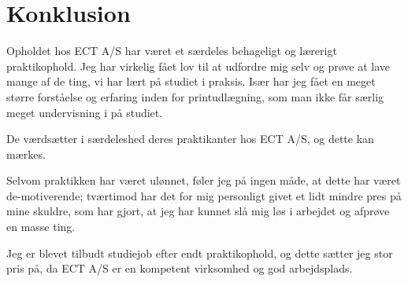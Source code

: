 \chapter{Konklusion}

Opholdet hos ECT A/S har været et særdeles behageligt og lærerigt praktikophold. Jeg har virkelig fået lov til at udfordre mig selv og prøve at lave mange af de ting, vi har lært på studiet i praksis. Især har jeg fået en meget større forståelse og erfaring inden for printudlægning, som man ikke får særlig meget undervisning i på studiet. 

De værdsætter i særdeleshed deres praktikanter hos ECT A/S, og dette kan mærkes.

Selvom praktikken har været ulønnet, føler jeg på ingen måde, at dette har været de-motiverende; tværtimod har det for mig personligt givet et lidt mindre pres på mine skuldre, som har gjort, at jeg har kunnet slå mig løs i arbejdet og afprøve en masse ting. 

Jeg er blevet tilbudt studiejob efter endt praktikophold, og dette sætter jeg stor pris på, da ECT A/S er en kompetent virksomhed og god arbejdsplads.